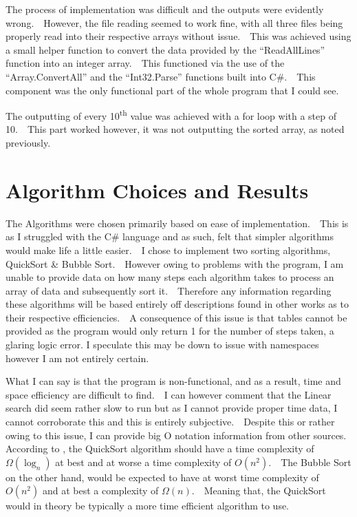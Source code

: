 \documentclass[11pt]{article} %
\begin{document}
The process of implementation was difficult and the outputs were evidently wrong.~~However, the file reading seemed to work fine, with all three files being properly read into their respective arrays without issue.~~This was achieved using a small helper function to convert the data provided by the ``ReadAllLines'' function into an integer array.~~This functioned via the use of the ``Array.ConvertAll'' and the ``Int32.Parse'' functions built into C\#.~~This component was the only functional part of the whole program that I could see.\par
The outputting of every 10\textsuperscript{th} value was achieved with a for loop with a step of 10.~~This part worked however, it was not outputting the sorted array, as noted previously.~~
\newpage
\section{Algorithm Choices and Results}
The Algorithms were chosen primarily based on ease of implementation.~~This is as I struggled with the C\# language and as such, felt that simpler algorithms would make life a little easier.~~I chose to implement two sorting algorithms, QuickSort \& Bubble Sort.~~However owing to problems with the program, I am unable to provide data on how many steps each algorithm takes to process an array of data and subsequently sort it.~~Therefore any information regarding these algorithms will be based entirely off descriptions found in other works as to their respective efficiencies.~~A consequence of this issue is that tables cannot be provided as the program would only return 1 for the number of steps taken, a glaring logic error. I speculate this may be down to issue with namespaces however I am not entirely certain.~~\par
What I can say is that the program is non-functional, and as a result, time and space efficiency are difficult to find.~~I can however comment that the Linear search did seem rather slow to run but as I cannot provide proper time data, I cannot corroborate this and this is entirely subjective.~~Despite this or rather owing to this issue, I can provide big O notation information from other sources. According to \autocite[1]{dorantes_quicksort_2022}, the QuickSort algorithm should have a time complexity of $\Omega(\log_n)$ at best and at worse a time complexity of $O(n^2)$.~~The Bubble Sort on the other hand, would be expected to have at worst time complexity of $O(n^2)$ and at best a complexity of $\Omega(n)$.~~Meaning that, the QuickSort would in theory be typically a more time efficient algorithm to use.\par
\end{document}
